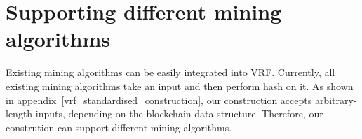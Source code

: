 \section{Supporting different mining algorithms}

Existing mining algorithms can be easily integrated into VRF.
Currently, all existing mining algorithms take an input and then perform hash on it. 
As shown in appendix~\ref{vrf_standardised_construction}, our construction accepts arbitrary-length inputs, depending on the blockchain data structure.
Therefore, our constrution can support different mining algorithms.